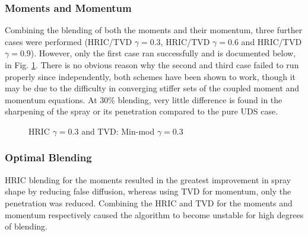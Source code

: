 \documentclass[a4paper,10pt]{article}
\begin{document}
\subsubsection{Moments and Momentum}
Combining the blending of both the moments and their momentum, three further cases were performed (HRIC/TVD $\gamma=0.3$, HRIC/TVD $\gamma=0.6$ and HRIC/TVD $\gamma=0.9$). However, only the first case ran successfully and is documented below, in Fig. \ref{fig:hric_tvd}. There is no obvious reason why the second and third case failed to run properly since independently, both schemes have been shown to work, though it may be due to the difficulty in converging stiffer sets of the coupled moment and momentum equations. At 30\% blending, very little difference is found in the sharpening of the spray or its penetration compared to the pure UDS case.
\begin{figure}[H]
\centering
{}
\caption{HRIC $\gamma=0.3$ and TVD: Min-mod $\gamma=0.3$}
\label{fig:hric_tvd}
\end{figure}



\subsubsection{Optimal Blending}
HRIC blending for the moments resulted in the greatest improvement in spray shape by reducing false diffusion, whereas using TVD for momentum, only the penetration was reduced. Combining the HRIC and TVD for the moments and momentum respectively caused the algorithm to become unstable for high degrees of blending.
\end{document}
